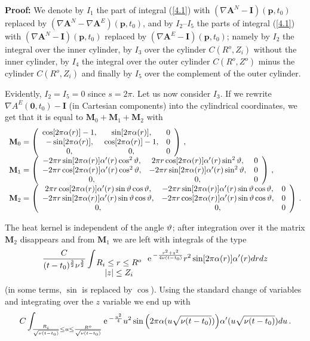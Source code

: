 \documentclass[12pt,twoside]{article}
\newcommand{\bA}{\mathbf{A}}
\def \al{\alpha}  \def \be{\beta}    \def \ga{\gamma}
\newcommand {\ee}{{\rm e}\,}
\newcommand {\bnul}{{\mathbf {0}}}
\newcommand {\bI}{{\mathbf{I}}}
\newcommand {\bM}{{\mathbf{M}}}
\newcommand {\bp}{{\mathbf{p}}}
\newcommand {\demo}{{\bf Proof:} }
\begin{document}
\demo
We denote by $I_1$ the part of integral (\ref{4.1})
with  $(\nabla \bA^N-\bI)(\bp,t_0)$ replaced by $(\nabla \bA^N-\nabla
\bA^E)(\bp,t_0)$, and by $I_2$--$I_5$ the parts of integral (\ref{4.1})
with $(\nabla \bA^N-\bI)(\bp,t_0)$ replaced by $(\nabla \bA^E-\bI)(\bp,t_0)$;
namely by $I_2$ the integral over the inner cylinder, by $I_3$ over the cylinder 
$C(R^o,Z_i)$ without the inner cylinder, by $I_4$ the integral over the 
outer cylinder $C(R^o,Z^o)$ minus the cylinder $C(R^o,Z_i)$ and finally by
$I_5$ over the complement of the outer cylinder.

Evidently, $I_2 = I_5 = 0$ since $s=2\pi$. Let us now consider $I_3$.
If we rewrite $\nabla A^E(\bnul, t_0)-\bI$ (in Cartesian components) 
into the cylindrical coordinates, we get that it is equal to $\bM_0 +
\bM_1 + \bM_2$ with
$$
\begin{array}{l}
\bM_0 =
\left( \begin{array}{ccc}
\cos [2\pi\al (r)]-1, &
\sin[2\pi \al (r)], & 0 \\
-\sin [2\pi\al (r)], &  
\cos [2\pi\al (r)]-1, & 0 \\
0, & 0, & 0 \end{array} \right)\, ,
\\[6pt]
\bM_1 =
\left( \begin{array}{ccc}
- 2\pi r \sin [2\pi\al (r)]\al'(r)\cos^2\vt, &
2\pi r  \cos [2\pi \al (r)]\al'(r) \sin^2\vt, & 0 \\
- 2\pi r \cos [2\pi\al (r)]\al'(r) \cos^2\vt, & - 2\pi r 
\sin [2\pi\al (r)]\al'(r) \sin^2\vt, & 0 \\
0, & 0, & 0 \end{array} \right)\, ,
\\[6pt]
\bM_2 =
\left( \begin{array}{ccc}
2\pi r  \cos [2\pi\al (r)]\al'(r) \sin \vt\cos\vt, & - 2\pi r 
\sin [2\pi\al (r)]\al'(r)\sin\vt\cos\vt, & 0 \\
- 2\pi r \sin [2\pi\al (r)]\al'(r)\sin \vt \cos\vt, &  
-2\pi r \cos [2\pi\al (r)]\al'(r) \sin\vt\cos\vt, & 0 \\
0, & 0, & 0 \end{array} \right)\, .
\end{array}
$$

The heat kernel is independent of the angle $\vartheta$; after integration over 
it the matrix $\bM_2$ disappears and from $\bM_1$ 
we are left with integrals of the type
$$
\frac{C}{(t-t_0)^{\frac 32} \nu^{\frac 32}} \int_{\index {\begin{array}{c}{
 R_i\leq r
\leq R^o }\\ { |z|\leq Z_i}\end{array}}} \ee^{-\frac{r^2+z^2}{4\nu (t-t_0)}} r^2
\sin [2\pi \al(r)] \al'(r) dr dz
$$
(in some terms, $\sin$ is replaced by $\cos$). Using the standard change of 
variables and integrating over the $z$ variable we end up with 
$$
C \int_{\frac{R_i}{\sqrt{\nu(t-t_0)}} \leq u \leq 
\frac{R^o}{\sqrt{\nu(t-t_0)}} } \ee^{-\frac{u^2}{4}} u^2 \sin \Big(2\pi 
\al(u \sqrt{\nu(t-t_0)})\Big) \al'(u\sqrt {\nu(t-t_0)}) d u\, .
$$
\end{document}
